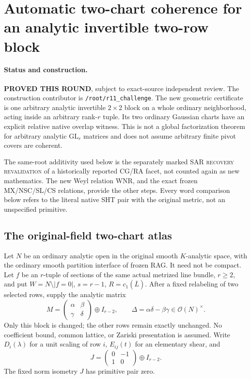 \section{Automatic two-chart coherence for an analytic invertible two-row block}
\label{sec:r11-gl2-block-two-chart}

\paragraph{Status and construction.}
\textbf{PROVED THIS ROUND}, subject to exact-source independent review.
The construction contributor is \texttt{/root/r11\_challenge}.
The new geometric certificate is one arbitrary analytic invertible
$2\times2$ block on a whole ordinary neighborhood, acting inside
an arbitrary rank-$r$ tuple.  Its two ordinary Gaussian charts have
an explicit relative native overlap witness.  This is not a global
factorization theorem for arbitrary analytic $\mathrm{GL}_r$ matrices
and does not assume arbitrary finite pivot covers are coherent.

The same-root additivity used below is the separately marked SAR
\textsc{recovery revalidation} of a historically reported CG/RA
facet, not counted again as new mathematics.  The new Weyl relation
WNR, and the exact frozen MX/NSC/SL/CS relations, provide the other
steps.  Every word comparison below refers to the literal native
SHT pair with the original metric, not an unspecified primitive.

\subsection{The original-field two-chart atlas}

Let $N$ be an ordinary analytic open in the original smooth
$K$-analytic space, with the ordinary smooth partition interface
of frozen RAG.  It need not be compact.  Let $f$ be an $r$-tuple
of sections of the same actual metrized line bundle, $r\ge2$,
and put $W=N\setminus|f=0|$, $s=r-1$, $R=c_1(\overline L)$.
After a fixed relabeling of two selected rows, supply the analytic
matrix
\[
 M=\begin{pmatrix}\alpha&\beta\\\gamma&\delta\end{pmatrix}
                      \oplus I_{r-2},\qquad
 \Delta=\alpha\delta-\beta\gamma\in\mathcal O(N)^\times.
 \tag{GB1}
\]
Only this block is changed; the other rows remain exactly unchanged.
No coefficient bound, common lattice, or Zariski presentation is
assumed.  Write $D_i(\lambda)$ for a unit scaling of row $i$,
$E_{ij}(t)$ for an elementary shear, and
\[
                J=\begin{pmatrix}0&-1\\1&0\end{pmatrix}
                      \oplus I_{r-2}.
 \tag{GB2}
\]
The fixed norm isometry $J$ has primitive pair zero.

